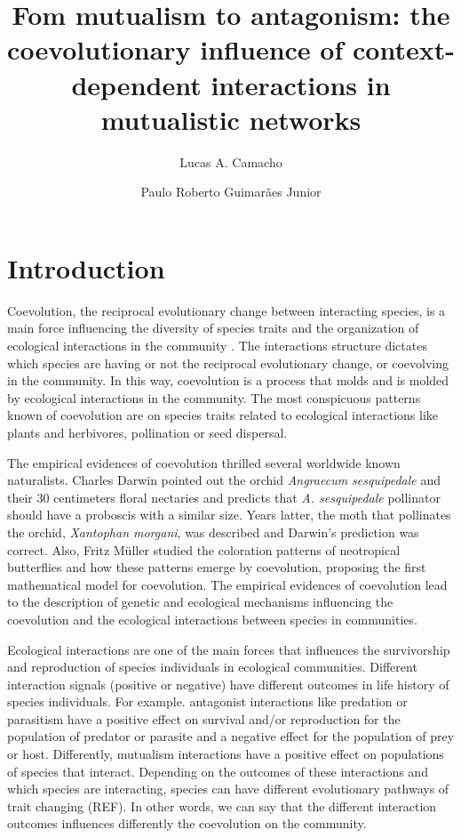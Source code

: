 \documentclass[a4paper, 12pt]{article}
\title{Fom mutualism to antagonism: the coevolutionary influence of  context-dependent interactions in mutualistic networks }
\author[1]{Lucas A. Camacho}
\author[2]{Paulo Roberto Guimarães Junior}
\affil[1,2]{Departamento de Ecologia, Universidade de São Paulo, Rua do Matão, travessa 14, nº 321, Cidade Universitária, São Paulo - SP, CEP: 05508-090, Brasil.}
\begin{document}
\maketitle

\section{Introduction}
Coevolution, the reciprocal evolutionary change between interacting species, is a main force influencing the diversity of species traits and the organization of ecological interactions in the community \cite{chamberlain_how_2014}. The interactions structure dictates which species are having or not the reciprocal evolutionary change, or coevolving in the community. In this way, coevolution is a process that molds and is molded by ecological interactions in the community. The most conspicuous patterns known of coevolution are on species traits related to ecological interactions like plants and herbivores, pollination or seed dispersal.

\par The empirical evidences of coevolution thrilled several worldwide known naturalists. Charles Darwin pointed out  the orchid \textit{Angraecum sesquipedale} and their 30 centimeters floral nectaries and predicts that \textit{A. sesquipedale} pollinator should have a proboscis with a similar size. Years latter, the moth that pollinates the orchid, \textit{Xantophan morgani}, was described and Darwin's prediction was correct. Also, Fritz Müller studied the coloration patterns of neotropical butterflies and how these patterns emerge by coevolution, proposing the first mathematical model for coevolution. The empirical evidences of coevolution lead to the description of genetic and ecological mechanisms influencing the coevolution and the ecological interactions between species in communities.

\par Ecological interactions are one of the main forces that influences the survivorship and reproduction of species individuals in ecological communities. Different interaction signals (positive or negative) have different outcomes in life history of species individuals. For example. antagonist interactions like predation or parasitism have a positive effect on survival and/or reproduction for the population of predator or parasite and a negative effect for the  population of prey or host. Differently, mutualism interactions have a positive effect on populations of species that interact. Depending on the outcomes of these interactions and which species are interacting, species can have different evolutionary pathways of trait changing (REF). In other words, we can say that the different interaction outcomes influences differently the coevolution on the community. 
\end{document}
